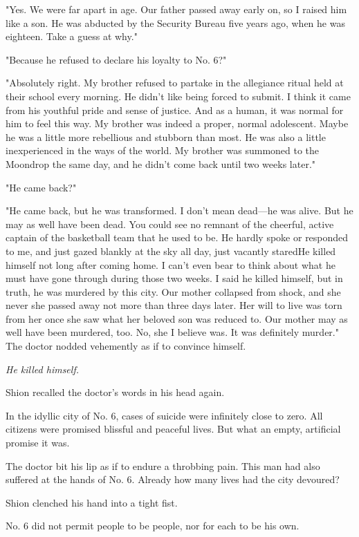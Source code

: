 "Yes. We were far apart in age. Our father passed away early on, so I
raised him like a son. He was abducted by the Security Bureau five years
ago, when he was eighteen. Take a guess at why."

"Because he refused to declare his loyalty to No. 6?"

"Absolutely right. My brother refused to partake in the allegiance
ritual held at their school every morning. He didn't like being forced
to submit. I think it came from his youthful pride and sense of justice.
And as a human, it was normal for him to feel this way. My brother was
indeed a proper, normal adolescent. Maybe he was a little more
rebellious and stubborn than most. He was also a little inexperienced in
the ways of the world. My brother was summoned to the Moondrop the same
day, and he didn't come back until two weeks later."

"He came back?"

"He came back, but he was transformed. I don't mean dead---he was alive.
But he may as well have been dead. You could see no remnant of the
cheerful, active captain of the basketball team that he used to be. He
hardly spoke or responded to me, and just gazed blankly at the sky all
day, just vacantly stared\el He killed himself not long after coming
home. I can't even bear to think about what he must have gone through
during those two weeks. I said he killed himself, but in truth, he was
murdered by this city. Our mother collapsed from shock, and she never\el 
she passed away not more than three days later. Her will to live was
torn from her once she saw what her beloved son was reduced to. Our
mother may as well have been murdered, too. No, she I believe was. It
was definitely murder." The doctor nodded vehemently as if to convince
himself.

\emph{He killed himself.}

Shion recalled the doctor's words in his head again.

In the idyllic city of No. 6, cases of suicide were infinitely close to
zero. All citizens were promised blissful and peaceful lives. But what
an empty, artificial promise it was.

The doctor bit his lip as if to endure a throbbing pain. This man had
also suffered at the hands of No. 6. Already how many lives had the city
devoured?

Shion clenched his hand into a tight fist.

No. 6 did not permit people to be people, nor for each to be his own.

